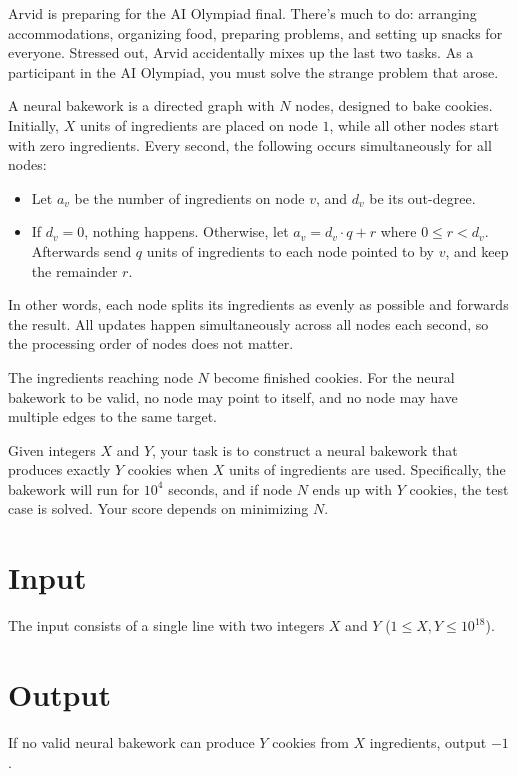 \noindent

Arvid is preparing for the AI Olympiad final. There's much to do: arranging accommodations, organizing food, preparing
problems, and setting up snacks for everyone. Stressed out, Arvid accidentally mixes up the last two tasks. As a
participant in the AI Olympiad, you must solve the strange problem that arose.

A neural bakework is a directed graph with $N$ nodes, designed to bake cookies.  
Initially, $X$ units of ingredients are placed on node $1$, while all other nodes start with zero ingredients.  
Every second, the following occurs simultaneously for all nodes:

\begin{itemize}
  \item Let $a_v$ be the number of ingredients on node $v$, and $d_v$ be its out-degree.
  \item If $d_v = 0$, nothing happens. Otherwise, let $a_v = d_v \cdot q + r$ where $0 \leq r < d_v$. Afterwards
  send $q$ units of ingredients to each node pointed to by $v$, and keep the remainder $r$.
\end{itemize}

In other words, each node splits its ingredients as evenly as possible and forwards 
the result. All updates happen simultaneously across all nodes 
each second, so the processing order of nodes does not matter.

The ingredients reaching node $N$ become finished cookies.  
For the neural bakework to be valid, no node may point to itself, 
and no node may have multiple edges to the same target.

Given integers $X$ and $Y$, your task is to construct a 
neural bakework that produces exactly $Y$ cookies when $X$ units 
of ingredients are used. Specifically, the bakework will run 
for $10^4$ seconds, and if node $N$ ends up with $Y$ cookies, 
the test case is solved. Your score depends on minimizing $N$.

\section*{Input}
The input consists of a single line with two integers $X$ and $Y$ ($1 \leq X, Y \leq 10^{18}$).

\section*{Output}
If no valid neural bakework can produce $Y$ cookies from $X$ ingredients, output $-1$.  

